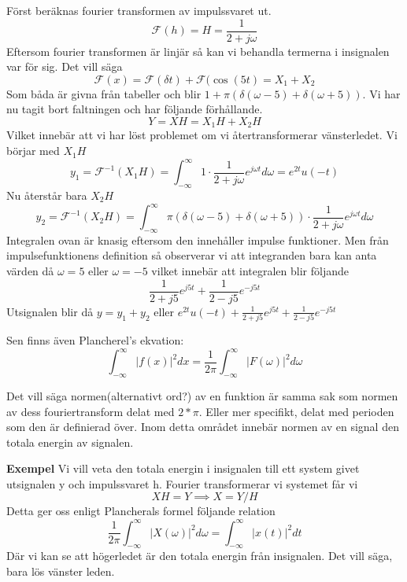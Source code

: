 \documentclass{article}
\begin{document}
Först beräknas fourier transformen av impulssvaret ut.
$$\mathcal{F}(h) = H = \frac{1}{2+j \omega}$$
Eftersom fourier transformen är linjär så kan vi behandla termerna i insignalen var för sig. Det vill säga
$$\mathcal{F} (x) = \mathcal{F}(\delta{t}) + \mathcal{F}(\cos(5 t) = X_1 + X_2 $$
Som båda är givna från tabeller och blir $1+\pi(\delta(\omega - 5) + \delta(\omega + 5))$. Vi har nu tagit bort faltningen och har följande förhållande.
$$Y = X H = X_1 H + X_2 H$$
Vilket innebär att vi har löst problemet om vi återtransformerar vänsterledet. Vi börjar med $X_1 H$
$$y_1=\mathcal{F}^{-1}(X_1 H) =  \int_{-\infty}^{\infty} 1 \cdot \frac{1}{2+j \omega} e^{j \omega t} d\omega = e^{2 t} u(-t)$$
Nu återstår bara $X_2 H$
$$y_2=\mathcal{F}^{-1}(X_2 H) = \int_{-\infty}^{\infty} \pi(\delta(\omega - 5) + \delta(\omega + 5)) \cdot \frac{1}{2+j \omega} e^{j \omega t} d\omega $$
Integralen ovan är knasig eftersom den innehåller impulse funktioner. Men från impulsefunktionens definition så observerar vi att integranden bara kan anta värden då $\omega=5$ eller $\omega =-5$ vilket innebär att integralen blir följande
$$\frac{1}{2+j 5} e^{j 5 t} + \frac{1}{2-j 5} e^{-j 5 t}$$ %
Utsignalen blir då $y=y_1 + y_2$ eller $e^{2 t} u(-t) + \frac{1}{2+j 5} e^{j 5 t} + \frac{1}{2-j 5} e^{-j 5 t}$

Sen finns även Plancherel's ekvation: %
$$\int_{-\infty}^{\infty} |f(x)|^2 dx = \frac{1}{2 \pi}\int_{-\infty}^{\infty} |F(\omega)|^2 d\omega $$ %

Det vill säga normen(alternativt ord?) av en funktion är samma sak som normen av dess fouriertransform delat med $2*\pi$. Eller mer specifikt, delat med perioden som den är definierad över. Inom detta området innebär normen av en signal den totala energin av signalen. %

\textbf{Exempel}
Vi vill veta den totala energin i insignalen till ett system givet utsignalen y och impulssvaret h. Fourier transformerar vi systemet får vi
$$X H = Y \implies X = Y/H$$
Detta ger oss enligt Plancherals formel följande relation
$$ \frac{1}{2 \pi} \int_{-\infty}^{\infty} |X(\omega)|^2 d \omega = \int_{-\infty}^{\infty} |x(t)|^2 d t $$
Där vi kan se att högerledet är den totala energin från insignalen.
Det vill säga, bara lös vänster leden.
\end{document}
